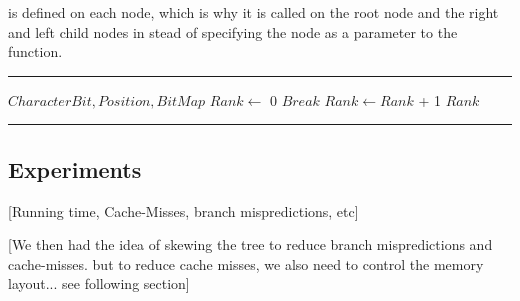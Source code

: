\noindent {} is defined on each node, which is why it is called on the root node and the right and left child nodes in stead of specifying the node as a parameter to the  function.


\noindent\rule{\textwidth}{0.5pt}
\begin{algorithmic} 
 {$CharacterBit, Position, BitMap$}
\State $Rank \gets$ 0
		\State $Break$
	\EndIf
		\State $Rank \gets Rank$ + 1 
	\EndIf
\EndFor
\State \Return $Rank$ 
\EndFunction
\end{algorithmic}
\noindent\rule{\textwidth}{0.5pt}
\linebreak

\subsection{Experiments}
[Running time, Cache-Misses, branch mispredictions, etc]



[We then had the idea of skewing the tree to reduce branch mispredictions and cache-misses. but to reduce cache misses, we also need to control the memory layout... see following section]